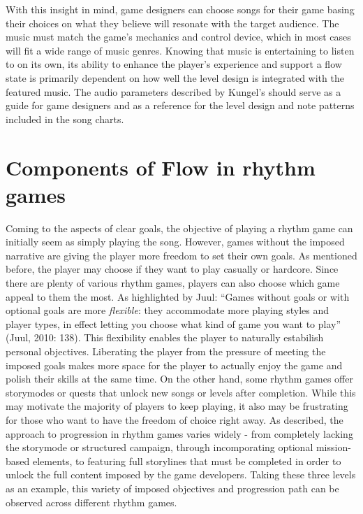 With this insight in mind, game designers can choose songs for their game basing their choices on what they believe will resonate with the target audience. The music must match the game’s mechanics and control device, which in most cases will fit a wide range of music genres. Knowing that music is entertaining to listen to on its own, its ability to enhance the player’s experience and support a flow state is primarily dependent on how well the level design is integrated with the featured music. The audio parameters described by Kungel’s should serve as a guide for game designers and as a reference for the level design and note patterns included in the song charts.

\section{Components of Flow in rhythm games}
Coming to the aspects of clear goals, the objective of playing a rhythm game can initially seem as simply playing the song. However, games without the imposed narrative are giving the player more freedom to set their own goals. As mentioned before, the player may choose if they want to play casually or hardcore. Since there are plenty of various rhythm games, players can also choose which game appeal to them the most. As highlighted by Juul: “Games without goals or with optional goals are more \textit{flexible}: they accommodate more playing styles and player types, in effect letting you choose what kind of game you want to play” (Juul, 2010: 138). This flexibility enables the player to naturally estabilish personal objectives. Liberating the player from the pressure of meeting the imposed goals makes more space for the player to actually enjoy the game and polish their skills at the same time. On the other hand, some rhythm games offer storymodes or quests that unlock new songs or levels after completion. While this may motivate the majority of players to keep playing, it also may be frustrating for those who want to have the freedom of choice right away.
As described, the approach to progression in rhythm games varies widely - from completely lacking the storymode or structured campaign, through incomporating optional mission-based elements, to featuring full storylines that must be completed in order to unlock the full content imposed by the game developers. Taking these three levels as an example, this variety of imposed objectives and progression path can be observed across different rhythm games.
